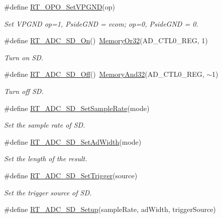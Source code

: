 \begin{DoxyCompactItemize}
\#define \mbox{\hyperlink{a00002_a92d5325c171f6afbf19fe0002ef5296d}{R\+T\+\_\+\+O\+P\+O\+\_\+\+Set\+V\+P\+G\+ND}}(op)
\begin{DoxyCompactList}\small\item\em Set V\+P\+G\+ND op=1, Pside\+G\+ND = vcom; op=0, Pside\+G\+ND = 0. \end{DoxyCompactList}\item 
\#define \mbox{\hyperlink{a00002_a3ed6d7d3daccf57a9ee5a9490d8985ad}{R\+T\+\_\+\+A\+D\+C\+\_\+\+S\+D\+\_\+\+On}}()~\mbox{\hyperlink{a00020_a27874a97deab7cecdde5ddecf466e31e}{Memory\+Or32}}(A\+D\+\_\+\+C\+T\+L0\+\_\+\+R\+EG, 1)
\begin{DoxyCompactList}\small\item\em Turn on SD. \end{DoxyCompactList}\item 
\#define \mbox{\hyperlink{a00002_ac57cb41fced89567b192b3a26bb0cb91}{R\+T\+\_\+\+A\+D\+C\+\_\+\+S\+D\+\_\+\+Off}}()~\mbox{\hyperlink{a00020_ad87cedffcaadc51db22594fce55173d4}{Memory\+And32}}(A\+D\+\_\+\+C\+T\+L0\+\_\+\+R\+EG, $\sim$1)
\begin{DoxyCompactList}\small\item\em Turn off SD. \end{DoxyCompactList}\item 
\#define \mbox{\hyperlink{a00002_a246ce987fa2b9f254f4796340eb23ed0}{R\+T\+\_\+\+A\+D\+C\+\_\+\+S\+D\+\_\+\+Set\+Sample\+Rate}}(mode)
\begin{DoxyCompactList}\small\item\em Set the sample rate of SD. \end{DoxyCompactList}\item 
\#define \mbox{\hyperlink{a00002_acb989d89893ac99af984979cb9e8df2a}{R\+T\+\_\+\+A\+D\+C\+\_\+\+S\+D\+\_\+\+Set\+Ad\+Width}}(mode)
\begin{DoxyCompactList}\small\item\em Set the length of the result. \end{DoxyCompactList}\item 
\#define \mbox{\hyperlink{a00002_a11bf38478bd196acd1f179115e714dfc}{R\+T\+\_\+\+A\+D\+C\+\_\+\+S\+D\+\_\+\+Set\+Trigger}}(source)
\begin{DoxyCompactList}\small\item\em Set the trigger source of SD. \end{DoxyCompactList}\item 
\#define \mbox{\hyperlink{a00002_a312f152517ab50c1cda791e118dd4473}{R\+T\+\_\+\+A\+D\+C\+\_\+\+S\+D\+\_\+\+Setup}}(sample\+Rate,  ad\+Width,  trigger\+Source)

\end{DoxyCompactItemize}
